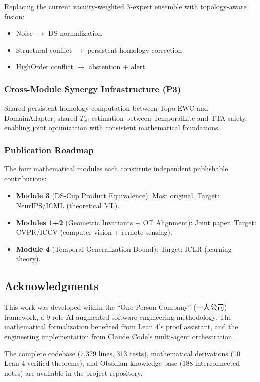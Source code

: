 Replacing the current vacuity-weighted 3-expert ensemble with topology-aware
fusion:
\begin{itemize}
    \item Noise $\to$ DS normalization
    \item Structural conflict $\to$ persistent homology correction
    \item HighOrder conflict $\to$ abstention + alert
\end{itemize}

\subsubsection{Cross-Module Synergy Infrastructure (P3)}

Shared persistent homology computation between Topo-EWC and DomainAdapter,
shared $T_{\text{eff}}$ estimation between TemporalLite and TTA safety,
enabling joint optimization with consistent mathematical foundations.

\subsubsection{Publication Roadmap}

The four mathematical modules each constitute independent publishable contributions:
\begin{itemize}
    \item \textbf{Module 3} (DS-Cup Product Equivalence): Most original.
    Target: NeurIPS/ICML (theoretical ML).
    \item \textbf{Modules 1+2} (Geometric Invariants + OT Alignment): Joint
    paper. Target: CVPR/ICCV (computer vision + remote sensing).
    \item \textbf{Module 4} (Temporal Generalization Bound): Target: ICLR
    (learning theory).
\end{itemize}

\subsection{Acknowledgments}

This work was developed within the ``One-Person Company'' (一人公司) framework,
a 9-role AI-augmented software engineering methodology. The mathematical
formalization benefited from Lean 4's proof assistant, and the engineering
implementation from Claude Code's multi-agent orchestration.

The complete codebase (7,329 lines, 313 tests), mathematical derivations
(10 Lean 4-verified theorems), and Obsidian knowledge base (188 interconnected
notes) are available in the project repository.
